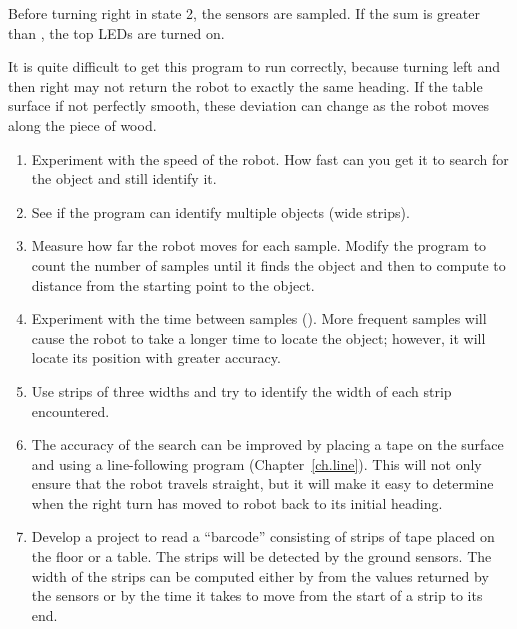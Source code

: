 Before turning right in state 2, the sensors are sampled.
If the sum is greater than , the top LEDs are turned on.


It is quite difficult to get this program to run correctly,
because turning left and then right may not return the robot
to exactly the same heading. If the table surface if not perfectly
smooth, these deviation can change as the robot moves along the piece of wood.


\begin{enumerate}

\item Experiment with the speed of the robot. How fast can you get it to
search for the object and still identify it.

\item See if the program can identify multiple objects (wide strips).

\item Measure how far the robot moves for each sample.
Modify the program to count the number of samples until it finds the object
and then to compute to distance from the starting point to the object.

\item Experiment with the time between samples ().
More frequent samples will cause the robot to take a longer time
to locate the object; however, it will locate its position
with greater accuracy.

\item Use strips of three widths and try to identify the width of
each strip encountered.

\item The accuracy of the search can be improved by
placing a tape on the surface and using a line-following program
(Chapter~\ref{ch.line}). This will not only ensure that the robot travels
straight, but it will make it easy to determine when the right turn
has moved to robot back to its initial heading.

\item Develop a project to read a ``barcode'' consisting of strips
of tape placed on the floor or a table. The strips will be detected
by the ground sensors. The width of the strips can be computed
either by from the values returned by the sensors or by the time it takes
to move from the start of a strip to its end.

\end{enumerate}
